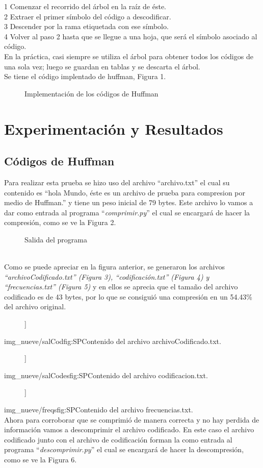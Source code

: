 \documentclass[12pt,twoside]{article}
\newcommand{\addfigure}[4]{
        \begin{figure}[htbp!]
            \begin{center}	
                \fbox{\texttt{[image: \#2]}}
                \caption{#4}
                \label{#3}
            \end{center}
        \end{figure}
  }
\begin{document}
1 Comenzar el recorrido del árbol en la raíz de éste.\\
2 Extraer el primer símbolo del código a descodificar.\\
3 Descender por la rama etiquetada con ese símbolo.\\
4 Volver al paso 2 hasta que se llegue a una hoja, que será el símbolo asociado al código.\\
En la práctica, casi siempre se utiliza el árbol para obtener todos los códigos de una sola vez; luego se guardan en tablas y se descarta el árbol.
\\
Se tiene el código implentado de huffman, Figura 1.
\vspace{10 mm}
\addfigure{.8  }{img_nueve/huffmanCodes}{fig:SP}{Implementación de los códigos de Huffman}
\section{Experimentación y Resultados}
\subsection{Códigos de Huffman}
Para realizar esta prueba se hizo uso del archivo ``archivo.txt'' el cual su contenido es ``hola Mundo, éste es un archivo de prueba para compresion por medio de Huffman.'' y tiene un peso inicial de 79 bytes. Este archivo lo vamos a dar como entrada al programa ``\textit{comprimir.py}'' el cual se encargará de hacer la compresión, como se ve la Figura 2.\\
\addfigure{.8  }{img_nueve/runProgram}{fig:SP}{Salida del programa}\\
Como se puede apreciar en la figura anterior, se generaron los archivos \textit{``archivoCodificado.txt'' (Figura 3), ``codificación.txt'' (Figura 4) y ``frecuencias.txt'' (Figura 5)} y en ellos se aprecia que el tamaño del archivo codificado es de 43 bytes, por lo que se consiguió una compresión en un 54.43\% del archivo original.


\addfigure{.8  }[H]{img_nueve/salCod}{fig:SP}{Contenido del archivo archivoCodificado.txt.}
\addfigure{.6 }[H]{img_nueve/salCodes}{fig:SP}{Contenido del archivo codificacion.txt.}
\addfigure{.8  }[H]{img_nueve/freqs}{fig:SP}{Contenido del archivo frecuencias.txt.}
\\
Ahora para corroborar que se comprimió de manera correcta y no hay perdida de información vamos a descomprimir el archivo codificado. En este caso el archivo codificado junto con el archivo de codificación forman la como entrada al programa ``\textit{descomprimir.py}'' el cual se encargará de hacer la descompresión, como se ve la Figura 6.\\
\end{document}
